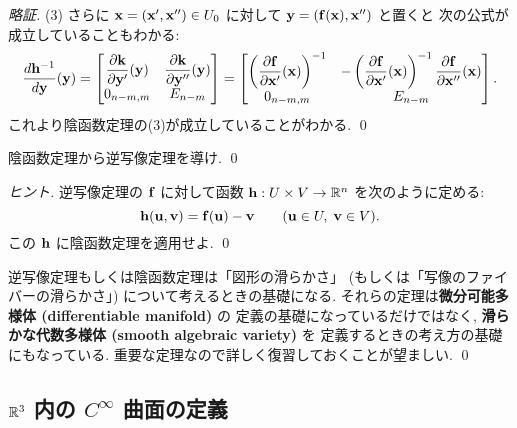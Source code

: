\documentclass[12pt,twoside]{jarticle}
\begin{document}
\begin{proof}[略証]
 (3) さらに ${\mathbf x}=({\mathbf x}',{\mathbf x}'')\in U_0$ に対して ${\mathbf y}=({\mathbf f}({\mathbf x}),{\mathbf x}'')$ と置くと
 次の公式が成立していることもわかる:
 \begin{equation*}
  \dfrac{d{\mathbf h}^{-1}}{d{\mathbf y}}({\mathbf y}) =
  \begin{bmatrix}
   \dfrac{\partial{\mathbf k}}{\partial{\mathbf y}'}({\mathbf y}) & \dfrac{\partial{\mathbf k}}{\partial{\mathbf y}''}({\mathbf y}) \\
   0_{n-m,m}               & E_{n-m} \\
  \end{bmatrix}
  =
  \begin{bmatrix}
   \left(\dfrac{\partial{\mathbf f}}{\partial{\mathbf x}'}({\mathbf x})\right)^{-1} & -\left(\dfrac{\partial{\mathbf f}}{\partial{\mathbf x}'}({\mathbf x})\right)^{-1}\dfrac{\partial{\mathbf f}}{\partial{\mathbf x}''}({\mathbf x}) \\
   0_{n-m,m}                                 & E_{n-m} \\
  \end{bmatrix}.
 \end{equation*}
 これより陰函数定理の(3)が成立していることがわかる.
 \qed
\end{proof}

\begin{question}
 陰函数定理から逆写像定理を導け. \qed
\end{question}

\begin{proof}[ヒント]
 逆写像定理の ${\mathbf f}$ に対して函数  ${\mathbf h}:U\times V\to{\mathbb R}^n$ を次のように定める:
 \begin{equation*}
  {\mathbf h}({\mathbf u},{\mathbf v}) = {\mathbf f}({\mathbf u}) - {\mathbf v}
  \qquad ({\mathbf u}\in U,\; {\mathbf v}\in V).
 \end{equation*}
 この ${\mathbf h}$ に陰函数定理を適用せよ. \qed
\end{proof}

\begin{guide}
 逆写像定理もしくは陰函数定理は「図形の滑らかさ」
 (もしくは「写像のファイバーの滑らかさ」) について考えるときの基礎になる.
 それらの定理は{\bf 微分可能多様体 (differentiable manifold)} の
 定義の基礎になっているだけではなく, 
 {\bf 滑らかな代数多様体 (smooth algebraic variety)} を
 定義するときの考え方の基礎にもなっている.
 重要な定理なので詳しく復習しておくことが望ましい.
 \qed
\end{guide}


\subsection{${\mathbb R}^3$ 内の $C^\infty$ 曲面の定義}
\end{document}
